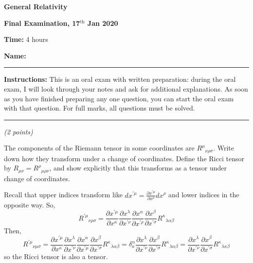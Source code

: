 \documentclass[12pt]{article}
\newcommand{\be}{\begin{equation}}
\newcommand{\ee}{\end{equation}}
\newcounter{quesno}
\newcommand{\ques}[1]{\vspace{3em}\stepcounter{quesno}
\noindent{\bf Question \thequesno.} \emph{(#1 points)\\}
}
\begin{document}
\begin{center}

{\bf\Large General Relativity}

\vspace{1em}
{\bf\large Final Examination, 17${}^{\text{th}}$ Jan 2020}

\vspace{1em}
{\bf Time:} 4 hours


\end{center} 
\vspace{1em}
{\bf\Large\noindent Name:}

\vspace{1em}
\hrule
\vspace{1em}
\noindent
{\bf Instructions:} 
This is an oral exam with written preparation: during the oral exam, I will look through your notes and ask for additional explanations. As soon as you have finished preparing any one question, you can start the oral exam with
that question. For full marks, all questions must be solved.

\vspace{1em}
\hrule

\ques{2} 
The components of the Riemann tensor in some coordinates are $R^\mu{}_{\nu\rho\sigma}$.
Write down how they transform under a change of coordinates.
Define the Ricci tensor by $R_{\mu\nu} = R^\rho{}_{\mu\rho\nu}$, and show explicitly that this transforms as a tensor under change of coordinates.

\vspace{1em}

\color{red}
Recall that upper indices transform like $dx^{\prime \mu} = \frac{\partial x^{\prime \mu}}{\partial x^\rho} dx^\rho$ and lower indices in the opposite way. 
So, 
\be
R^{\prime \mu}{}_{\nu\rho\sigma}
= 
\frac{\partial x^{\prime \mu}}{\partial x^\kappa} \frac{\partial x^\lambda}{\partial x^{\prime \nu}} \frac{\partial x^\alpha}{\partial x^{\prime \rho}} \frac{\partial x^\beta}{\partial x^{\prime \sigma}} 
R^{\kappa}{}_{\lambda\alpha\beta}
\ee
Then,
\be
R^{\prime \mu}{}_{\nu\mu\sigma}
= 
\frac{\partial x^{\prime \mu}}{\partial x^\kappa} \frac{\partial x^\lambda}{\partial x^{\prime \nu}} \frac{\partial x^\alpha}{\partial x^{\prime \mu}} \frac{\partial x^\beta}{\partial x^{\prime \sigma}} 
R^{\kappa}{}_{\lambda\alpha\beta}= 
\delta_\kappa^\alpha  \frac{\partial x^\lambda}{\partial x^{\prime \nu}} \frac{\partial x^\beta}{\partial x^{\prime \sigma}} R^{\kappa}{}_{\lambda\alpha\beta}
= 
  \frac{\partial x^\lambda}{\partial x^{\prime \nu}} \frac{\partial x^\beta}{\partial x^{\prime \sigma}} 
R^{\kappa}{}_{\lambda\kappa\beta}
\ee
so the Ricci tensor is also a tensor.
\end{document}
